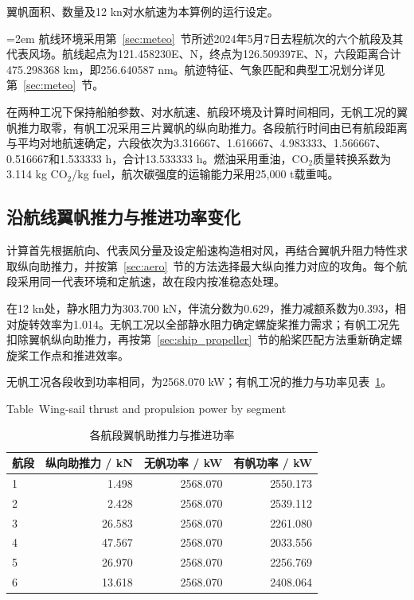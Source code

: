 \documentclass[UTF8,a4paper,twoside,zihao=5,fontset=windows]{ctexart}
\begin{document}
翼帆面积、数量及12 kn对水航速为本算例的运行设定。

\begingroup\emergencystretch=2em
航线环境采用第~\ref{sec:meteo}~节所述2024年5月7日去程航次的六个航段及其代表风场。航线起点为121.458230\textdegree{}E、\textdegree{}N，\allowbreak 终点为126.509397\textdegree{}E、\textdegree{}N，\allowbreak 六段距离合计475.298368 km，即256.640587 nm。航迹特征、气象匹配和典型工况划分详见第~\ref{sec:meteo}~节。

\par\endgroup

在两种工况下保持船舶参数、对水航速、航段环境及计算时间相同，无帆工况的翼帆推力取零，有帆工况采用三片翼帆的纵向助推力。各段航行时间由已有航段距离与平均对地航速确定，六段依次为3.316667、1.616667、4.983333、1.566667、0.516667和1.533333 h，合计13.533333 h。燃油采用重油，CO$_2$质量转换系数为3.114 kg CO$_2$/kg fuel，航次碳强度的运输能力采用25,000 t载重吨。

\subsection{沿航线翼帆推力与推进功率变化}

计算首先根据航向、代表风分量及设定船速构造相对风，再结合翼帆升阻力特性求取纵向助推力，并按第~\ref{sec:aero}~节的方法选择最大纵向推力对应的攻角。每个航段采用同一代表环境和定航速，故在段内按准稳态处理。

在12 kn处，静水阻力为303.700 kN，伴流分数为0.629，推力减额系数为0.393，相对旋转效率为1.014。无帆工况以全部静水阻力确定螺旋桨推力需求；有帆工况先扣除翼帆纵向助推力，再按第~\ref{sec:ship_propeller}~节的船桨匹配方法重新确定螺旋桨工作点和推进效率。

无帆工况各段收到功率相同，为2568.070 kW；有帆工况的推力与功率见表~\ref{tab:case_power}。
\begin{table}[htbp]
\centering
\small
\setlength{\tabcolsep}{6pt}
\renewcommand{\arraystretch}{1.4}
\caption{各航段翼帆助推力与推进功率}
{\small Table~\thetable\quad Wing-sail thrust and propulsion power by segment\par}
\smallskip
\label{tab:case_power}
\begin{tabular}{@{}lrrr@{}}
\toprule
航段 & 纵向助推力 / kN & 无帆功率 / kW & 有帆功率 / kW \\
\midrule
1 & 1.498 & 2568.070 & 2550.173 \\
2 & 2.428 & 2568.070 & 2539.112 \\
3 & 26.583 & 2568.070 & 2261.080 \\
4 & 47.567 & 2568.070 & 2033.556 \\
5 & 26.970 & 2568.070 & 2256.769 \\
6 & 13.618 & 2568.070 & 2408.064 \\
\bottomrule
\end{tabular}
\end{table}
\FloatBarrier
\end{document}
